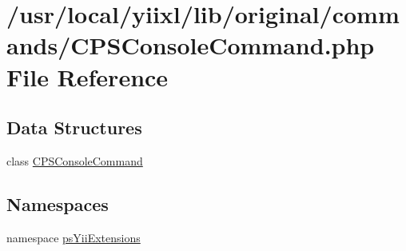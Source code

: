 \hypertarget{CPSConsoleCommand_8php}{
\section{/usr/local/yiixl/lib/original/commands/CPSConsoleCommand.php File Reference}
\label{CPSConsoleCommand_8php}
}
\subsection*{Data Structures}
\begin{DoxyCompactItemize}
\item 
class \hyperlink{classCPSConsoleCommand}{CPSConsoleCommand}
\end{DoxyCompactItemize}
\subsection*{Namespaces}
\begin{DoxyCompactItemize}
\item 
namespace \hyperlink{namespacepsYiiExtensions}{psYiiExtensions}
\end{DoxyCompactItemize}

